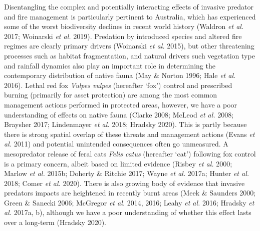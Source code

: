 \documentclass[11pt,a4paper,titlepage,twoside,openright]{style/unimelbthesis}
\begin{document}
\begin{mainmatter}
Disentangling the complex and potentially interacting effects of invasive predator and fire management is particularly pertinent to Australia, which has experienced some of the worst biodiversity declines in recent world history (Waldron \emph{et al.} 2017; Woinarski \emph{et al.} 2019). Predation by introduced species and altered fire regimes are clearly primary drivers (Woinarski \emph{et al.} 2015), but other threatening processes such as habitat fragmentation, and natural drivers such vegetation type and rainfall dynamics also play an important role in determining the contemporary distribution of native fauna (May \& Norton 1996; Hale \emph{et al.} 2016). Lethal red fox \emph{Vulpes vulpes} (hereafter `fox') control and prescribed burning (primarily for asset protection) are among the most common management actions performed in protected areas, however, we have a poor understanding of effects on native fauna (Clarke 2008; McLeod \emph{et al.} 2008; Braysher 2017; Lindenmayer \emph{et al.} 2018; Hradsky 2020). This is partly because there is strong spatial overlap of these threats and management actions (Evans \emph{et al.} 2011) and potential unintended consequences often go unmeasured. A mesopredator release of feral cats \emph{Felis catus} (hereafter `cat') following fox control is a primary concern, albeit based on limited evidence (Risbey \emph{et al.} 2000; Marlow \emph{et al.} 2015b; Doherty \& Ritchie 2017; Wayne \emph{et al.} 2017a; Hunter \emph{et al.} 2018; Comer \emph{et al.} 2020). There is also growing body of evidence that invasive predators impacts are heightened in recently burnt areas (Meek \& Saunders 2000; Green \& Sanecki 2006; McGregor \emph{et al.} 2014, 2016; Leahy \emph{et al.} 2016; Hradsky \emph{et al.} 2017a, b), although we have a poor understanding of whether this effect lasts over a long-term (Hradsky 2020).


\end{mainmatter}
\end{document}
